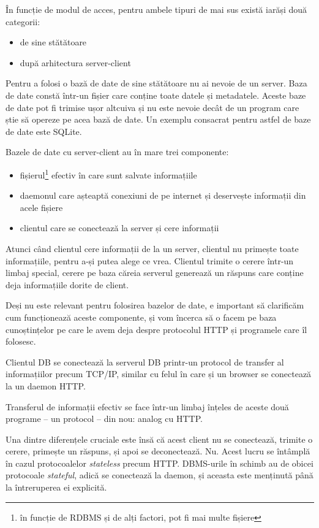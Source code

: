 În funcție de modul de acces, pentru ambele tipuri de mai sus există
iarăși două categorii:
\begin{itemize}
\item de sine stătătoare
\item după arhitectura server-client
\end{itemize}

Pentru a folosi o bază de date de sine stătătoare nu ai nevoie de un
server. Baza de date constă într-un fișier care conține toate datele
și metadatele. Aceste baze de date pot fi trimise ușor altcuiva
și nu este nevoie decât de un program care știe să opereze pe acea
bază de date. Un exemplu consacrat pentru astfel de baze de date
este SQLite.

Bazele de date cu server-client au în mare trei componente:
\begin{itemize}
\item fișierul\footnote{în funcție de RDBMS și de alți
factori, pot fi mai multe fișiere} efectiv în care sunt salvate
informațiile
\item daemonul care așteaptă conexiuni de pe internet și
deservește informații din acele fișiere
\item clientul care se conectează la server și cere informații
\end{itemize}

Atunci când clientul cere informații de la un server, clientul
nu primește toate informațiile, pentru a-și putea alege ce vrea.
Clientul trimite o cerere într-un limbaj special, cerere pe baza
căreia serverul generează un răspuns care conține deja informațiile
dorite de client.

Deși nu este relevant pentru folosirea bazelor de date, e important
să clarificăm cum funcționează aceste componente, și vom încerca
să o facem pe baza cunoștințelor pe care le avem deja despre
protocolul HTTP și programele care îl folosesc.

Clientul DB se conectează la serverul DB printr-un protocol
de transfer al informațiilor precum TCP/IP, similar cu
felul în care și un browser se conectează la un daemon HTTP.

Transferul de informații efectiv se face într-un limbaj înțeles
de aceste două programe -- un protocol -- din nou: analog cu HTTP.

Una dintre diferențele cruciale este însă că acest client nu se
conectează, trimite o cerere, primește un răspuns, și apoi se
deconectează. Nu. Acest lucru se întâmplă în cazul protocoalelor
\textit{stateless} precum HTTP. DBMS-urile în schimb au de obicei
protocoale \textsl{stateful}, adică se conectează la daemon, și
aceasta este menținută până la întreruperea ei explicită.

